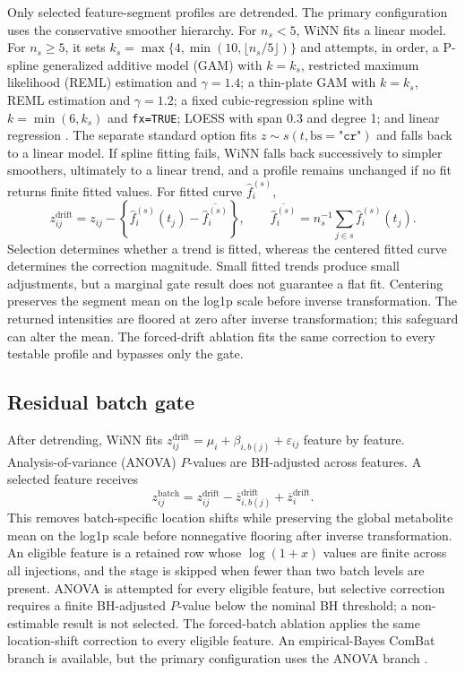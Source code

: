 \documentclass[namedate,webpdf,modern,large,nocrop]{oup-authoring-template}
\begin{document}
Only selected feature-segment profiles are detrended. The primary configuration uses the conservative smoother hierarchy. For \(n_s<5\), WiNN fits a linear model. For \(n_s\geq5\), it sets \(k_s=\max\{4,\min(10,\lfloor n_s/5\rfloor)\}\) and attempts, in order, a P-spline generalized additive model (GAM) with \(k=k_s\), restricted maximum likelihood (REML) estimation and \(\gamma=1.4\); a thin-plate GAM with \(k=k_s\), REML estimation and \(\gamma=1.2\); a fixed cubic-regression spline with \(k=\min(6,k_s)\) and \texttt{fx=TRUE}; LOESS with span 0.3 and degree 1; and linear regression \citep{Cleveland1979LOESS,Wood2017GAM}. The separate standard option fits \(z\sim s(t,\mathrm{bs}=\texttt{"cr"})\) and falls back to a linear model. If spline fitting fails, WiNN falls back successively to simpler smoothers, ultimately to a linear trend, and a profile remains unchanged if no fit returns finite fitted values. For fitted curve \(\widehat f_i^{(s)}\),
\[
z_{ij}^{\mathrm{drift}}=z_{ij}-\left\{\widehat f_i^{(s)}(t_j)-\overline{\widehat f_i^{(s)}}\right\},\qquad
\overline{\widehat f_i^{(s)}}=n_s^{-1}\sum_{j\in s}\widehat f_i^{(s)}(t_j).
\]
Selection determines whether a trend is fitted, whereas the centered fitted curve determines the correction magnitude. Small fitted trends produce small adjustments, but a marginal gate result does not guarantee a flat fit. Centering preserves the segment mean on the log1p scale before inverse transformation. The returned intensities are floored at zero after inverse transformation; this safeguard can alter the mean. The forced-drift ablation fits the same correction to every testable profile and bypasses only the gate.

\subsection{Residual batch gate}

After detrending, WiNN fits \(z_{ij}^{\mathrm{drift}}=\mu_i+\beta_{i,b(j)}+\varepsilon_{ij}\) feature by feature. Analysis-of-variance (ANOVA) \(P\)-values are BH-adjusted across features. A selected feature receives
\[
z_{ij}^{\mathrm{batch}}=z_{ij}^{\mathrm{drift}}-\overline z_{i,b(j)}^{\mathrm{drift}}+\overline z_i^{\mathrm{drift}}.
\]
This removes batch-specific location shifts while preserving the global metabolite mean on the log1p scale before nonnegative flooring after inverse transformation. An eligible feature is a retained row whose \(\log(1+x)\) values are finite across all injections, and the stage is skipped when fewer than two batch levels are present. ANOVA is attempted for every eligible feature, but selective correction requires a finite BH-adjusted \(P\)-value below the nominal BH threshold; a non-estimable result is not selected. The forced-batch ablation applies the same location-shift correction to every eligible feature. An empirical-Bayes ComBat branch is available, but the primary configuration uses the ANOVA branch \citep{Johnson2007ComBat}.
\end{document}
